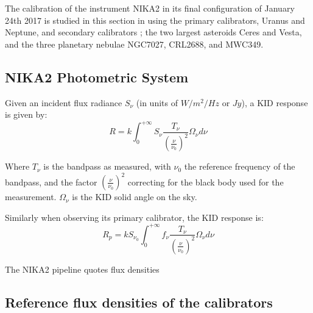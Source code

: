 %

The calibration of the instrument NIKA2 in its final configuration
of January 24th 2017  is studied in this section  in using the 
 primary calibrators, Uranus and Neptune, and secondary calibrators ; the two largest asteroids Ceres and Vesta, and the three
planetary nebulae NGC7027, CRL2688, and MWC349.

\subsection{NIKA2 Photometric System}

Given an incident flux radiance $S_{\nu}$ (in units of $W/m^{2}/Hz$ or $Jy$), a
KID response is given by: 
\begin{equation}
R = k \int_{0}^{+\infty} S_{\nu}
\frac{T_{\nu}}{\left(\frac{\nu}{\nu_{0}}\right)^{2}} \Omega_{\nu} d\nu
\end{equation}

Where $T_{\nu}$ is the bandpass as measured, with $\nu_{0}$ the
reference frequency of the bandpass, and the factor
$\left(\frac{\nu}{\nu_{0}}\right)^2$ correcting for the black body
used for the measurement. $\Omega_{\nu}$ is the KID
solid angle on the sky.  

Similarly when observing its primary calibrator, the KID response is:
\begin{equation}
R_{p} = k S_{\nu_{0}} \int_{0}^{+\infty} f_{\nu}
\frac{T_{\nu}}{\left(\frac{\nu}{\nu_{0}}\right)^{2}} \Omega_{\nu} d\nu
\end{equation}

The NIKA2 pipeline quotes flux densities


\subsection{Reference flux densities of the calibrators}

